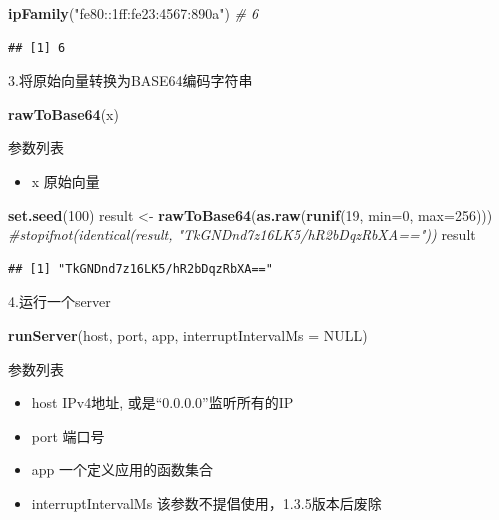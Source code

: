 \documentclass[]{book}
\newenvironment{Shaded}{\begin{snugshade}}{\end{snugshade}}
\newcommand{\KeywordTok}[1]{\textcolor[rgb]{0.13,0.29,0.53}{\textbf{#1}}}
\newcommand{\DataTypeTok}[1]{\textcolor[rgb]{0.13,0.29,0.53}{#1}}
\newcommand{\DecValTok}[1]{\textcolor[rgb]{0.00,0.00,0.81}{#1}}
\newcommand{\StringTok}[1]{\textcolor[rgb]{0.31,0.60,0.02}{#1}}
\newcommand{\CommentTok}[1]{\textcolor[rgb]{0.56,0.35,0.01}{\textit{#1}}}
\newcommand{\OtherTok}[1]{\textcolor[rgb]{0.56,0.35,0.01}{#1}}
\newcommand{\NormalTok}[1]{#1}
\providecommand{\tightlist}{%
  \setlength{\itemsep}{0pt}\setlength{\parskip}{0pt}}
\begin{document}
\begin{Shaded}
\begin{Highlighting}[]
\KeywordTok{ipFamily}\NormalTok{(}\StringTok{"fe80::1ff:fe23:4567:890a"}\NormalTok{) }\CommentTok{# 6}
\end{Highlighting}
\end{Shaded}

\begin{verbatim}
## [1] 6
\end{verbatim}

3.将原始向量转换为BASE64编码字符串

\begin{Shaded}
\begin{Highlighting}[]
\KeywordTok{rawToBase64}\NormalTok{(x)}
\end{Highlighting}
\end{Shaded}

参数列表

\begin{itemize}
\tightlist
\item
  x 原始向量
\end{itemize}

\begin{Shaded}
\begin{Highlighting}[]
\KeywordTok{set.seed}\NormalTok{(}\DecValTok{100}\NormalTok{)}
\NormalTok{result <-}\StringTok{ }\KeywordTok{rawToBase64}\NormalTok{(}\KeywordTok{as.raw}\NormalTok{(}\KeywordTok{runif}\NormalTok{(}\DecValTok{19}\NormalTok{, }\DataTypeTok{min=}\DecValTok{0}\NormalTok{, }\DataTypeTok{max=}\DecValTok{256}\NormalTok{)))}
\CommentTok{#stopifnot(identical(result, "TkGNDnd7z16LK5/hR2bDqzRbXA=="))}
\NormalTok{result}
\end{Highlighting}
\end{Shaded}

\begin{verbatim}
## [1] "TkGNDnd7z16LK5/hR2bDqzRbXA=="
\end{verbatim}

4.运行一个server

\begin{Shaded}
\begin{Highlighting}[]
\KeywordTok{runServer}\NormalTok{(host, port, app, }\DataTypeTok{interruptIntervalMs =} \OtherTok{NULL}\NormalTok{)}
\end{Highlighting}
\end{Shaded}

参数列表

\begin{itemize}
\item
  host IPv4地址, 或是``0.0.0.0''监听所有的IP
\item
  port 端口号
\item
  app 一个定义应用的函数集合
\item
  interruptIntervalMs 该参数不提倡使用，1.3.5版本后废除
\end{itemize}
\end{document}
